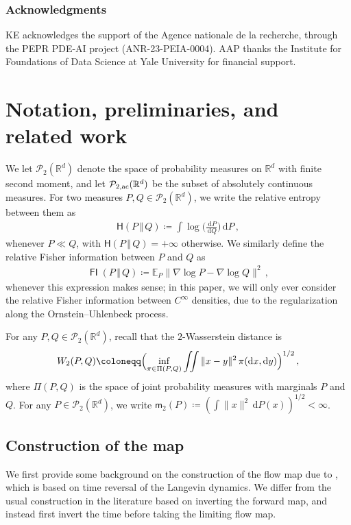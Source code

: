 \documentclass[12pt]{article}
\newcommand{\cP}{\mathcal{P}}
\newcommand{\RR}{\mathbb{R}}
\newcommand{\R}{\RR}
\newcommand{\E}{\mathbb{E}}
\newcommand{\1}{\mathds{1}}
\newcommand*{\defeq}{\coloneqq}
\newcommand*{\rd}{\mathrm{d}}
\newcommand*{\dd}{\, \rd}
\newcommand{\mmid}{\,\Vert\,}
\DeclareMathOperator*{\FI}{\mathsf{FI}}
\newcommand{\mom}{\mathsf m_2}
\theoremstyle{plain}
\theoremstyle{definition}
\theoremstyle{remark}
\begin{document}
\subsubsection*{Acknowledgments}
KE acknowledges the support of the Agence nationale de la recherche, through the PEPR PDE-AI project (ANR-23-PEIA-0004). AAP thanks the Institute for Foundations of Data Science at Yale University for financial support. 

\section{Notation, preliminaries, and related work}
We let $\cP_2(\R^d)$ denote the space of probability measures on $\R^d$ with finite second moment, and let $\cP_{2,\rm ac}(\R^d)$ be the subset of absolutely continuous measures. For two measures $P,Q \in \cP_2(\R^d)$, we write the relative entropy between them as 
\begin{align*}
{\mathsf H}(P\mmid Q) \defeq \int \log \bigl(\frac{\dd P}{\dd Q}\bigr) \dd P\,,
\end{align*}
whenever $P \ll Q$, with  ${\mathsf H}(P\mmid Q) = +\infty$ otherwise. We similarly define the relative Fisher information between $P$ and $Q$ as
\begin{align*}
\FI(P\mmid Q) \defeq \E_P\|\nabla \log P - \nabla \log Q\|^2\,,
\end{align*}
whenever this expression makes sense; in this paper, we will only ever consider the relative Fisher information between $C^\infty$ densities, due to the regularization along the Ornstein--Uhlenbeck process.

For any $P,Q \in \cP_2(\R^d)$, recall that the $2$-Wasserstein distance is
\begin{align*}
W_2(P,Q) \defeq \Bigl(\inf_{\pi \in \Pi(P,Q)} \iint \|x-y\|^2\, \pi(\!\dd x,\!\dd y)\Bigr)^{1/2}\,,
\end{align*} 
where $\Pi(P,Q)$ is the space of joint probability measures with marginals $P$ and $Q$. For any $P \in \cP_2(\R^d)$, we write $\mom(P) \defeq (\int \|x\|^2\dd P(x))^{1/2} < \infty$.  

\subsection{Construction of the map}\label{sec:construction}


We first provide some background on the construction of the flow map due to \cite{kim2012generalization}, which is based on time reversal of the Langevin dynamics. We differ from the usual construction in the literature based on inverting the forward map, and instead first invert the time before taking the limiting flow map.
\end{document}
